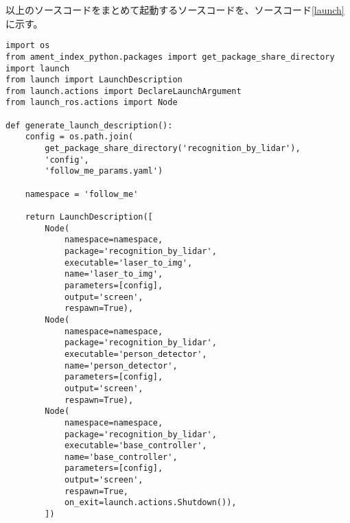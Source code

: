 以上のソースコードをまとめて起動するソースコードを、ソースコード\ref{launch}に示す。
\begin{lstlisting}[caption=follow\_me.launch.py, label=launch]
import os
from ament_index_python.packages import get_package_share_directory
import launch
from launch import LaunchDescription
from launch.actions import DeclareLaunchArgument
from launch_ros.actions import Node

def generate_launch_description():
    config = os.path.join(
        get_package_share_directory('recognition_by_lidar'),
        'config',
        'follow_me_params.yaml')

    namespace = 'follow_me'

    return LaunchDescription([
        Node(
            namespace=namespace,
            package='recognition_by_lidar',
            executable='laser_to_img',
            name='laser_to_img',
            parameters=[config],
            output='screen',
            respawn=True),
        Node(
            namespace=namespace,
            package='recognition_by_lidar',
            executable='person_detector',
            name='person_detector',
            parameters=[config],
            output='screen',
            respawn=True),
        Node(
            namespace=namespace,
            package='recognition_by_lidar',
            executable='base_controller',
            name='base_controller',
            parameters=[config],
            output='screen',
            respawn=True,
            on_exit=launch.actions.Shutdown()),
        ])
\end{lstlisting}